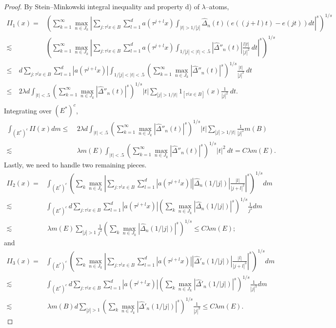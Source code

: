 \documentclass[11pt]{amsart}
\theoremstyle{definition}
\theoremstyle{remark}
\begin{document}
\begin{proof}
By Stein--Minkowski integral inequality and property d) of $\lambda$--atoms,
\begin{align*} 
II_{1}(x) = &  \left(\sum_{k=1}^{\infty} \max_{n\in J_k} \left| \sum_{j: \tau^jx\in B} \sum_{l=1}^{d}a(\tau^{j+l}x)
\int_{|t|>1/|j|} 
\hat\Delta_n(t) (e((j+l)t)- e(jt) ) dt  \right|^s \right)^{1/s} \\
\lesssim &
\left(\sum_{k=1}^{\infty} \max_{n\in J_k}  \left| \sum_{j: \tau^jx\in B} \sum_{l=1}^{d}  a(\tau^{j+l} x) 
\int_{1/|j|<|t|<.5} |\hat\Delta''_n(t)|  \frac{l |t|}{|j|^2} \ dt \right|^s\right)^{1/s} 
 \end{align*}
\begin{align*} 
\le &  \ d \sum_{j: \tau^jx\in B} \sum_{l=1}^{d}  |a(\tau^{j+l} x)|  \int_{1/|j|<|t|<.5} \left(\sum_{k=1}^{\infty}  \max_{n\in J_k} |\hat\Delta''_n(t)|^s\right)^{1/s} \frac{|t|}{|j|^2} \ dt\\
 \le & \ 2\lambda d \int_{|t|<.5} \left(\sum_{k=1}^{\infty} \max_{n\in J_k} |\hat\Delta''_n(t)|^s\right)^{1/s} |t|
 \sum_{|j|>1/|t|} 1_{[\tau^jx\in B]}(x) \frac{1}{|j|^2} \ dt.\\
 \end{align*}
 Integrating over $(E^*)^c$,
\begin{align*}  
\int_{(E^*)^c} II(x) dm   
  \le & \ 2\lambda d \int_{|t|<.5} \left(\sum_{k=1}^{\infty} \max_{n\in J_k} |\hat\Delta''_n(t)|^s\right)^{1/s} |t| \sum_{|j|>1/|t|} \frac{1}{|j|^2}
  m(B)\\
\lesssim & \  \lambda m(E) \int_{|t|<.5} \left(\sum_{k=1}^{\infty} \max_{n\in J_k} |\hat\Delta''_n(t)|^s\right)^{1/s} |t|^2 \ dt= C \lambda m(E).
\end{align*}
%
Lastly, we need to handle two remaining pieces.
\begin{align*} 
II_{2}(x) = & \int_{(E^*)^c} \left(\sum_k \max_{n\in J_k} \left| \sum_{j: \tau^jx\in B} \sum_{l=1}^{d} |a(\tau^{j+l} x)| 
 \left| \hat\Delta_n(1/|j|) \right| \frac{|l|}{|j+l|^2} \right|^s\right)^{1/s} dm\\
 \lesssim & \int_{(E^*)^c }   d \sum_{j: \tau^jx\in B} \sum_{l=1}^{d} |a(\tau^{j+l} x)| 
 \left(\sum_k \max_{n\in J_k} \left| \hat\Delta_n(1/|j|) \right|^s \right)^{1/s} \frac{1}{j^2} dm\\
  \lesssim & \  \lambda  m(E)  \sum_{|j|>1} 
 \frac 1{j^2}  \left(\sum_k  \max_{n\in J_k}  \left| \hat\Delta_n(1/|j|) \right|^s \right)^{1/s}
 \le  C \lambda m(E);
 \end{align*}
 and
\begin{align*} 
II_{3}(x) = & \int_{(E^*)^c } \left(\sum_k \max_{n\in J_k} \left| \sum_{j: \tau^jx\in B} \sum_{l=1}^{d} |a(\tau^{j+l} x)| 
 \left| \hat\Delta'_n(1/|j|) \right| \frac{|l|}{|j+l|^3} \right|^s\right)^{1/s} dm \\
  \lesssim & \int_{(E^*)^c }   d \sum_{j: \tau^jx\in B} \sum_{l=1}^{d} |a(\tau^{j+l} x)| 
 \left(\sum_k \max_{n\in J_k} 
 \left| \hat\Delta'_n(1/|j|) \right|^s \right)^{1/s} \frac{1}{|j|^3} dm\\
  \lesssim & \ \lambda m(B) d \sum_{|j|>1} \left(\sum_k \max_{n\in J_k} 
 \left| \hat\Delta'_n(1/|j|) \right|^s \right)^{1/s}
 \frac 1{|j|^3} 
   \le   
     C \lambda m(E).
 \end{align*}



\end{proof}
\end{document}
